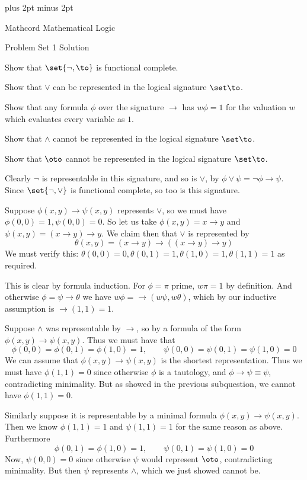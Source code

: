

\parindent=0pt
\parskip=3pt plus 2pt minus 2pt



\centerline{Mathcord Mathematical Logic}
\centerline{Problem Set 1 Solution}

\bprob

    \benum
        \item Show that $\set{\neg,\to}$ is functional complete.
        \item Show that $\lor$ can be represented in the logical signature $\set\to$.
        \item Show that any formula $\phi$ over the signature $\to$ has $w\phi=1$ for the
        valuation $w$ which evaluates every variable as $1$.
        \item Show that $\land$ cannot be represented in the logical signature $\set\to$.
        \item Show that $\oto$ cannot be represented in the logical signature $\set\to$.
    \eenum

\eprob

\benum
    \item Clearly $\neg$ is representable in this signature, and so is $\lor$, by $\phi\lor\psi=\neg\phi\to\psi$.
    Since $\set{{\neg},{\lor}}$ is functional complete, so too is this signature.
    \item Suppose $\phi(x,y)\to\psi(x,y)$ represents $\lor$, so we must have $\phi(0,0)=1,\psi(0,0)=0$.
    So let us take $\phi(x,y)=x\to y$ and $\psi(x,y)=(x\to y)\to y$.
    We claim then that $\lor$ is represented by
    $$ \theta(x,y) = (x\to y)\to((x\to y)\to y) $$
    We must verify this: $\theta(0,0)=0,\theta(0,1)=1,\theta(1,0)=1,\theta(1,1)=1$ as required.
    \item This is clear by formula induction.
    For $\phi=\pi$ prime, $w\pi=1$ by definition.
    And otherwise $\phi=\psi\to\theta$ we have $w\phi={\to}(w\psi,w\theta)$, which by our inductive assumption is ${\to}(1,1)=1$.
    \item Suppose $\land$ was representable by $\to$, so by a formula of the form $\phi(x,y)\to\psi(x,y)$.
    Thus we must have that
    $$ \phi(0,0) = \phi(0,1) = \phi(1,0) = 1,\qquad \psi(0,0) = \psi(0,1) = \psi(1,0) = 0 $$
    We can assume that $\phi(x,y)\to\psi(x,y)$ is the shortest representation.
    Thus we must have $\phi(1,1)=0$ since otherwise $\phi$ is a tautology, and $\phi\to\psi\equiv\psi$, contradicting minimality.
    But as showed in the previous subquestion, we cannot have $\phi(1,1)=0$.
    \item Similarly suppose it is representable by a minimal formula $\phi(x,y)\to\psi(x,y)$.
    Then we know $\phi(1,1)=1$ and $\psi(1,1)=1$ for the same reason as above.
    Furthermore
    $$ \phi(0,1) = \phi(1,0) = 1,\qquad \psi(0,1) = \psi(1,0) = 0 $$
    Now, $\psi(0,0)=0$ since otherwise $\psi$ would represent $\oto$, contradicting minimality.
    But then $\psi$ represents $\land$, which we just showed cannot be.
\eenum

